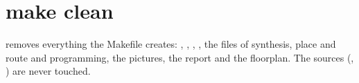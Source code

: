 \section{make clean}

 removes everything the Makefile creates: ,
, , , the files of synthesis, place
and route and programming, the pictures, the report and the floorplan. The
sources (, ) are never touched.
